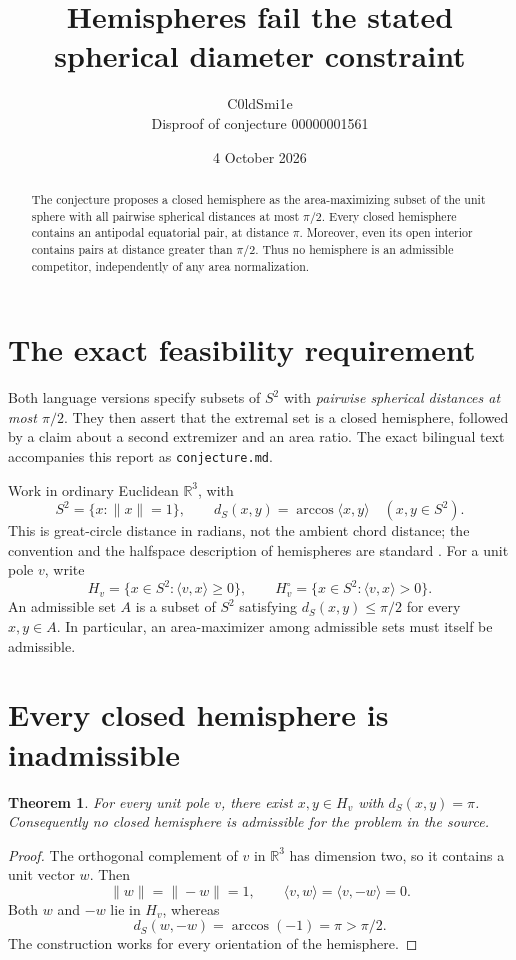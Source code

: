 \documentclass[10pt]{article}
\title{Hemispheres fail the stated spherical diameter constraint}
\author{C0ldSmi1e\\\small Disproof of conjecture 00000001561}
\date{4 October 2026}
\newtheorem{theorem}{Theorem}
\newcommand{\R}{\mathbb R}
\newcommand{\ip}[2]{\langle #1,#2\rangle}
\begin{document}
\maketitle
\begin{abstract}
The conjecture proposes a closed hemisphere as the area-maximizing subset of the unit sphere with all pairwise spherical distances at most $\pi/2$. Every closed hemisphere contains an antipodal equatorial pair, at distance $\pi$. Moreover, even its open interior contains pairs at distance greater than $\pi/2$. Thus no hemisphere is an admissible competitor, independently of any area normalization.
\end{abstract}

\section{The exact feasibility requirement}
Both language versions specify subsets of $S^2$ with \emph{pairwise spherical distances at most $\pi/2$}. They then assert that the extremal set is a closed hemisphere, followed by a claim about a second extremizer and an area ratio. The exact bilingual text accompanies this report as \texttt{conjecture.md}.

Work in ordinary Euclidean $\R^3$, with
\[
 S^2=\{x:\|x\|=1\},\qquad
 d_S(x,y)=\arccos\ip{x}{y}\quad(x,y\in S^2).
\]
This is great-circle distance in radians, not the ambient chord distance; the convention and the halfspace description of hemispheres are standard \cite{klartag}. For a unit pole $v$, write
\[
 H_v=\{x\in S^2:\ip{v}{x}\ge0\},\qquad
 H_v^\circ=\{x\in S^2:\ip{v}{x}>0\}.
\]
An admissible set $A$ is a subset of $S^2$ satisfying $d_S(x,y)\le\pi/2$ for every $x,y\in A$. In particular, an area-maximizer among admissible sets must itself be admissible.

\section{Every closed hemisphere is inadmissible}
\begin{theorem}
For every unit pole $v$, there exist $x,y\in H_v$ with $d_S(x,y)=\pi$. Consequently no closed hemisphere is admissible for the problem in the source.
\end{theorem}
\begin{proof}
The orthogonal complement of $v$ in $\R^3$ has dimension two, so it contains a unit vector $w$. Then
\[
 \|w\|=\|-w\|=1,\qquad
 \ip{v}{w}=\ip{v}{-w}=0.
\]
Both $w$ and $-w$ lie in $H_v$, whereas
\[
 d_S(w,-w)=\arccos(-1)=\pi>\pi/2.
\]
The construction works for every orientation of the hemisphere.
\end{proof}
\end{document}
